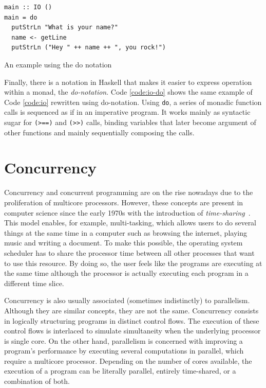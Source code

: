 \begin{listing}
  \begin{verbatim}
main :: IO ()
main = do
  putStrLn "What is your name?"
  name <- getLine
  putStrLn ("Hey " ++ name ++ ", you rock!")
  \end{verbatim}
  \caption{An example using the do notation}
  \label{code:io-do}
\end{listing}

Finally, there is a notation in Haskell that makes it easier to express operation within a monad, the \emph{do-notation}. Code \ref{code:io-do} shows the same example of Code \ref{code:io} rewritten using do-notation. Using \texttt{do}, a series of monadic function calls is sequenced as if in an imperative program. It works mainly as syntactic sugar for \texttt{(>==)} and \texttt{(>>)} calls, binding variables that later become argument of other functions and mainly sequentially composing the calls.


\section{Concurrency}
Concurrency and concurrent programming are on the rise nowadays due to the proliferation of multicore processors. However, these concepts are present in computer science since the early 1970s with the introduction of \emph{time-sharing}~\citep{lea:2006}. This model enables, for example, multi-tasking, which allows users to do several things at the same time in a computer such as browsing the internet, playing music and writing a document. To make this possible, the operating system scheduler has to share the processor time between all other processes that want to use this resource. By doing so, the user feels like the programs are executing at the same time although the processor is actually executing each program in a different time slice.

Concurrency is also usually associated (sometimes indistinctly) to parallelism. Although they are similar concepts, they are not the same. Concurrency consists in logically structuring programs in distinct control flows. The execution of these control flows is interlaced to simulate simultaneity when the underlying processor is single core. On the other hand, parallelism is concerned with improving a program's performance by executing several computations in parallel, which require a multicore processor. Depending on the number of cores available, the execution of a program can be literally parallel, entirely time-shared, or a combination of both.

